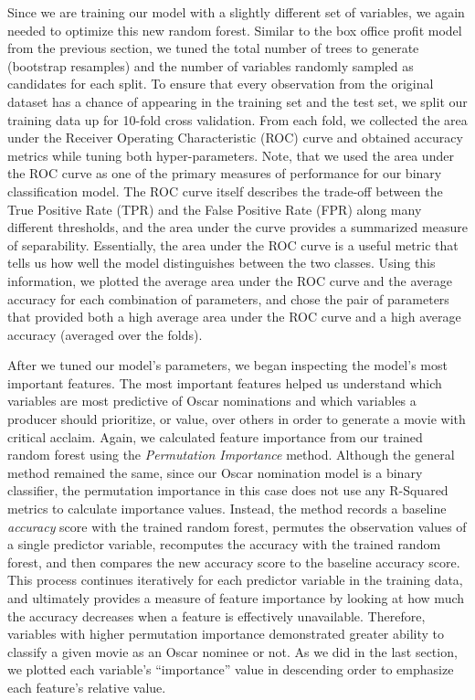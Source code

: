 \documentclass[10pt]{article}
\begin{document}
Since we are training our model with a slightly different set of variables, we again needed to optimize this new random forest. Similar to the box office profit model from the previous section, we tuned the total number of trees to generate (bootstrap resamples) and the number of variables randomly sampled as candidates for each split. To ensure that every observation from the original dataset has a chance of appearing in the training set and the test set, we split our training data up for 10-fold cross validation. From each fold, we collected the area under the Receiver Operating Characteristic (ROC) curve and obtained accuracy metrics while tuning both hyper-parameters. Note, that we used the area under the ROC curve as one of the primary measures of performance for our binary classification model. The ROC curve itself describes the trade-off between the True Positive Rate (TPR) and the False Positive Rate (FPR) along many different thresholds, and the area under the curve provides a summarized measure of separability. Essentially, the area under the ROC curve is a useful metric that tells us how well the model distinguishes between the two classes. Using this information, we plotted the average area under the ROC curve and the average accuracy for each combination of parameters, and chose the pair of parameters that provided both a high average area under the ROC curve and a high average accuracy (averaged over the folds).

After we tuned our model’s parameters, we began inspecting the model’s most important features. The most important features helped us understand which variables are most predictive of Oscar nominations and which variables a producer should prioritize, or value, over others in order to generate a movie with critical acclaim. Again, we calculated feature importance from our trained random forest using the \textit{Permutation Importance} method. Although the general method remained the same, since our Oscar nomination model is a binary classifier, the permutation importance in this case does not use any R-Squared metrics to calculate importance values. Instead, the method records a baseline \textit{accuracy} score with the trained random forest, permutes the observation values of a single predictor variable, recomputes the accuracy with the trained random forest, and then compares the new accuracy score to the baseline accuracy score. This process continues iteratively for each predictor variable in the training data, and ultimately provides a measure of feature importance by looking at how much the accuracy decreases when a feature is effectively unavailable. Therefore, variables with higher permutation importance demonstrated greater ability to classify a given movie as an Oscar nominee or not. As we did in the last section, we plotted each variable’s “importance” value in descending order to emphasize each feature’s relative value.
\end{document}

